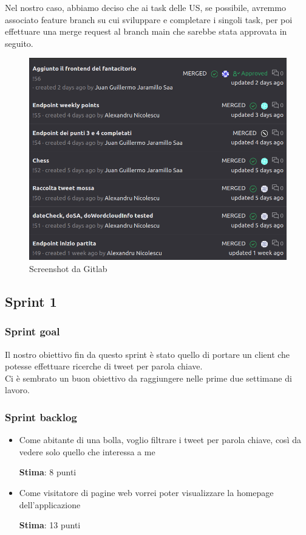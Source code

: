 \documentclass{article}
\begin{document}
Nel nostro caso, abbiamo deciso che ai task delle US, se possibile, avremmo associato feature branch su cui sviluppare e completare i singoli task, per poi effettuare una merge request al branch main che sarebbe stata approvata in seguito.
\begin{figure}[H]
    \centering
    \includegraphics[scale=0.23]{misc/mergerequests.png}
    \caption{Screenshot da Gitlab}
    \label{fig:mergerequests}
\end{figure}
\subsection{Sprint 1}
\subsubsection{Sprint goal}
Il nostro obiettivo fin da questo sprint \`e stato quello di portare un client che potesse effettuare ricerche di tweet per parola chiave. \\
Ci \`e sembrato un buon obiettivo da raggiungere nelle prime due settimane di lavoro.
\subsubsection{Sprint backlog}
\begin{itemize}
    \item Come abitante di una bolla, voglio filtrare i tweet per parola chiave, così da vedere solo quello che interessa a me

    \textbf{Stima}: 8 punti
    \item Come visitatore di pagine web vorrei poter visualizzare la homepage dell'applicazione

    \textbf{Stima}: 13 punti
\end{itemize}
\end{document}
